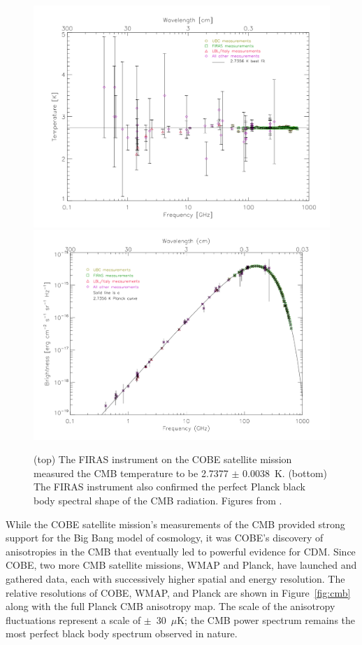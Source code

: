 \begin{figure}[htbp]
\begin{center}
\includegraphics[width=\textwidth]{figures/theory/cobe_temp.png} \\
\includegraphics[width=\textwidth]{figures/theory/cobe_spectrum.png}
\caption{(top) The FIRAS instrument on the COBE satellite mission measured the \acs{CMB} temperature to be 2.7377 $\pm$ 0.0038~K. (bottom) The FIRAS instrument also confirmed the perfect Planck black body spectral shape of the \acs{CMB} radiation. Figures from \cite{Smoot1999}. }
\label{fig:cobe}
\end{center}
\end{figure}

While the COBE satellite mission's measurements of the \ac{CMB} provided strong support for the Big Bang model of cosmology, it was COBE's discovery of anisotropies in the \ac{CMB} that eventually led to powerful evidence for \ac{CDM}. Since COBE, two more \ac{CMB} satellite missions, WMAP and Planck, have launched and gathered data, each with successively higher spatial and energy resolution. The relative resolutions of COBE, WMAP, and Planck are shown in Figure~\ref{fig:cmb} along with the full Planck \ac{CMB} anisotropy map. The scale of the anisotropy fluctuations represent a scale of  $\pm$~30~$\mu$K; the \ac{CMB} power spectrum remains the most perfect black body spectrum observed in nature. 

